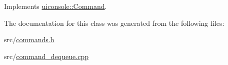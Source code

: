 Implements \hyperlink{classuiconsole_1_1Command_a5c4d205b1de13a6b3d0db73ddc7ebefa}{uiconsole::Command}.



The documentation for this class was generated from the following files:\begin{DoxyCompactItemize}
\item 
src/\hyperlink{commands_8h}{commands.h}\item 
src/\hyperlink{command__dequeue_8cpp}{command\_\-dequeue.cpp}\end{DoxyCompactItemize}
